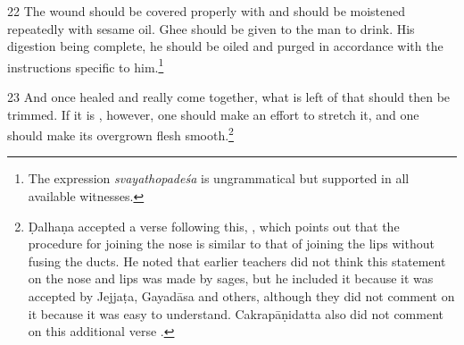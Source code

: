 \begin{translation}
    \item[22] 
    The wound should be covered properly with  and should be
    moistened repeatedly with sesame oil.  Ghee should be given to the man to
    drink.  His digestion being complete, he should be oiled and purged in
    accordance with the instructions specific to him.\footnote{The expression 
    \emph{svayathopadeśa} is ungrammatical but supported in all available 
    witnesses.}   
    
    \item[23] %
And once healed and really come together, what is left of that
 should then be trimmed. If it is 
, however, one should make an effort to stretch it, and one
should make its overgrown flesh smooth.\footnote{Ḍalhaṇa  accepted a verse
following this, , which points out that the procedure for
joining the nose is similar to that of joining the lips without fusing the
ducts. He noted that earlier teachers did not think this
statement on the nose and lips was made by sages, but he included it because
it was accepted by Jejjaṭa, Gayadāsa and others, although they did not comment on it 
because it was easy to understand. Cakrapāṇidatta also did
not comment on this additional verse \citep[133]{acar-1939}.}
    
    
\end{translation}    
